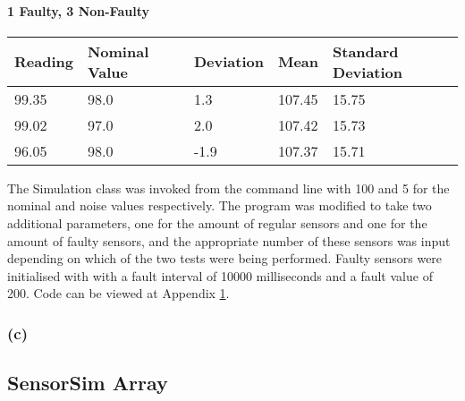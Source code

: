 \documentclass[]{report}
\begin{document}
				\subsubsection{1 Faulty, 3 Non-Faulty}
					\begin{table}[h!]
						\begin{tabular}{| l | l | l | l | l |}
							\hline
							Reading & Nominal Value & Deviation & Mean   & Standard Deviation \\
							\hline
							99.35   & 98.0          & 1.3       & 107.45 & 15.75              \\
							99.02   & 97.0          & 2.0       & 107.42 & 15.73              \\
							96.05   & 98.0          & -1.9      & 107.37 & 15.71              \\
							\hline
						\end{tabular}
					\end{table}
				
				The Simulation class was invoked from the command line with 100 and 5 for the nominal and noise values respectively. The program was modified to take two additional parameters, one for the amount of regular sensors and one for the amount of faulty sensors, and the appropriate number of these sensors was input depending on which of the two tests were being performed. Faulty sensors were initialised with with a fault interval of 10000 milliseconds and a fault value of 200. Code can be viewed at Appendix \ref{sensorsimcode}.
				
			\subsection{(c)}
			
			
		
	
	
	\newpage
	\begin{appendices}
	\chapter{SensorSim Array}
	\label{sensorsimcode}
	
	\end{appendices}
\end{document}
